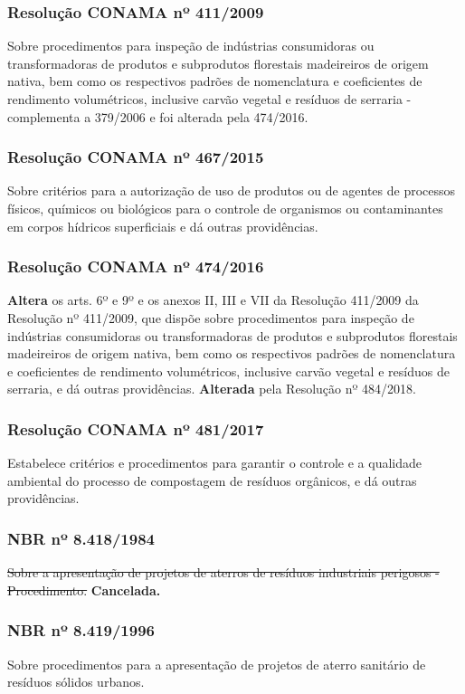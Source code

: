 \begin{subapend}
\begin{subsubapend}
		\subsubsection{Resolução CONAMA nº 411/2009}
		Sobre procedimentos para inspeção de indústrias consumidoras ou transformadoras de produtos e subprodutos florestais madeireiros de origem nativa, bem como os respectivos padrões de nomenclatura e coeficientes de rendimento volumétricos, inclusive carvão vegetal e resíduos de serraria - complementa a 379/2006 e foi alterada pela 474/2016.
		\subsubsection{Resolução CONAMA nº 467/2015}
		Sobre critérios para a autorização de uso de produtos ou de agentes de processos físicos, químicos ou biológicos para o controle de organismos ou contaminantes em corpos hídricos superficiais e dá outras providências.
		\subsubsection{Resolução CONAMA nº 474/2016}
		\textbf{Altera} os arts. 6º e 9º e os anexos II, III e VII da Resolução 411/2009 da Resolução nº 411/2009, que dispõe sobre procedimentos para inspeção de indústrias consumidoras ou transformadoras de produtos e subprodutos florestais madeireiros de origem nativa, bem como os respectivos padrões de nomenclatura e coeficientes de rendimento volumétricos, inclusive carvão vegetal e resíduos de serraria, e dá outras providências. \textbf{Alterada} pela Resolução nº 484/2018.
		\subsubsection{Resolução CONAMA nº 481/2017}
		Estabelece critérios e procedimentos para garantir o controle e a qualidade ambiental do processo de compostagem de resíduos orgânicos, e dá outras providências.
		\subsubsection{NBR nº 8.418/1984}
		\sout{Sobre a apresentação de projetos de aterros de resíduos industriais perigosos - Procedimento.} \textbf{Cancelada.}
		\subsubsection{NBR nº 8.419/1996}
		Sobre procedimentos para a apresentação de projetos de aterro sanitário de resíduos sólidos urbanos.

\end{subsubapend}
\end{subapend}
